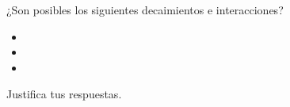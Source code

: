 \documentclass[./../main.tex]{subfiles}
\begin{document}
    \begin{exercise}
        ¿Son posibles los siguientes decaimientos e interacciones?

        \begin{itemize}
            \item \ch{\Omega- -> \Sigma+ + \e- + {$\overline{\nu}$}_{\e}}
            \item {}
            \item {}
        \end{itemize}

        Justifica tus respuestas.
    \end{exercise}
\end{document}

